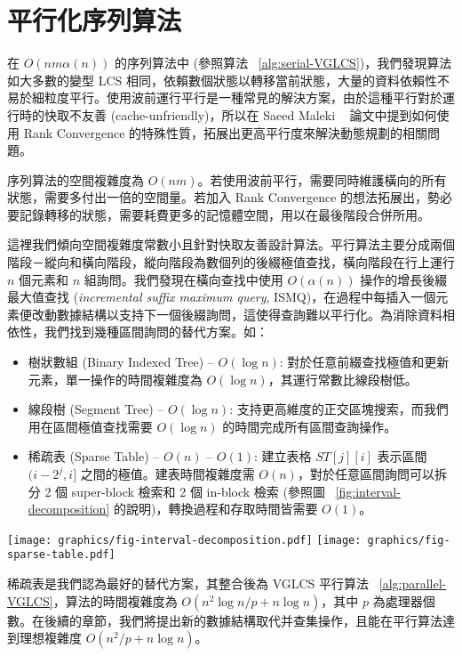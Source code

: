 \section{平行化序列算法} %
\label{sec:parallelSerial}

在 $O(nm \alpha(n))$ 的序列算法中 (參照算法 ~\ref{alg:serial-VGLCS})，我們發現算法如大多數的變型 LCS 相同，依賴數個狀態以轉移當前狀態，大量的資料依賴性不易於細粒度平行。使用波前運行平行是一種常見的解決方案，由於這種平行對於運行時的快取不友善 (cache-unfriendly)，所以在 Saeed Maleki ~\cite{saeed} 論文中提到如何使用 Rank Convergence 的特殊性質，拓展出更高平行度來解決動態規劃的相關問題。



序列算法的空間複雜度為 $O(nm)$。若使用波前平行，需要同時維護橫向的所有狀態，需要多付出一倍的空間量。若加入 Rank Convergence 的想法拓展出，勢必要記錄轉移的狀態，需要耗費更多的記憶體空間，用以在最後階段合併所用。

這裡我們傾向空間複雜度常數小且針對快取友善設計算法。平行算法主要分成兩個階段－縱向和橫向階段，縱向階段為數個列的後綴極值查找，橫向階段在行上運行 $n$ 個元素和 $n$ 組詢問。我們發現在橫向查找中使用 $O(\alpha(n))$ 操作的增長後綴最大值查找 (\emph{incremental suffix maximum query}, ISMQ)，在過程中每插入一個元素便改動數據結構以支持下一個後綴詢問，這使得查詢難以平行化。為消除資料相依性，我們找到幾種區間詢問的替代方案。如：

\begin{itemize}
  \item 樹狀數組 (Binary Indexed Tree) -- $O(\log n)$: 對於任意前綴查找極值和更新元素，單一操作的時間複雜度為 $O(\log n)$，其運行常數比線段樹低。
  \item 線段樹 (Segment Tree) -- $O(\log n)$: 支持更高維度的正交區塊搜索，而我們用在區間極值查找需要 $O(\log n)$ 的時間完成所有區間查詢操作。
  \item 稀疏表 (Sparse Table) -- $O(n)$ -- $O(1)$:
    建立表格 $ST[j][i]$ 表示區間 $(i-2^j,i]$ 之間的極值。建表時間複雜度需 $O(n)$，對於任意區間詢問可以拆分 2 個 super-block 檢索和 2 個 in-block 檢索 (參照圖 ~\ref{fig:interval-decomposition} 的說明)，轉換過程和存取時間皆需要 $O(1)$。
\end{itemize}

\begin{figure*}[!thb]
  \centering
  \texttt{[image: graphics/fig-interval-decomposition.pdf]}
  \texttt{[image: graphics/fig-sparse-table.pdf]}
  \caption{給定一陣列 $A$ 如上圖所述，並且拆成 5 個區塊，每個區塊皆有 4 個元素，若詢問區間 $[2, 18]$ 的最大值，將分成 $B1$ 的內部詢問 (in-block query) $Q_L$、$B5$ 的內部詢問 $Q_R$ 和兩個跨區間詢問 (super-block query) $SQ_L$、$SQ_R$}
  \label{fig:interval-decomposition}
\end{figure*}

稀疏表是我們認為最好的替代方案，其整合後為 VGLCS 平行算法 ~\ref{alg:parallel-VGLCS}，算法的時間複雜度為 $O(n^2 \log n / p + n \log n)$，其中 $p$ 為處理器個數。在後續的章節，我們將提出新的數據結構取代并查集操作，且能在平行算法達到理想複雜度 $O(n^2 / p + n \log n)$。

